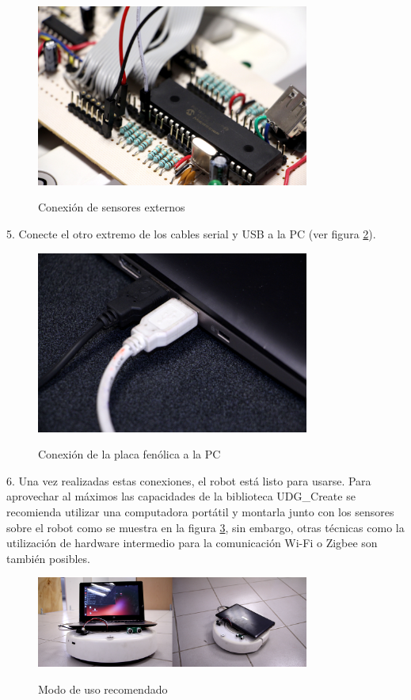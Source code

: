 \documentclass[letterpaper]{book}
\begin{document}
\begin{figure}
\begin{center}
\includegraphics[width=0.8\textwidth]{figures/sensors.jpg}
\caption{Conexión de sensores externos}
\centering
\label{fig:sensors}
\end{center}
\end{figure} 
5. Conecte el otro extremo de los cables serial y USB a la PC (ver figura \ref{fig:computerCables}).\\
\begin{figure}
\begin{center}
\includegraphics[width=0.8\textwidth]{figures/computerCables.jpg}
\caption{Conexión de la placa fenólica a la PC}
\centering
\label{fig:computerCables}
\end{center}
\end{figure} 
6. Una vez realizadas estas conexiones, el robot está listo para usarse. Para aprovechar al máximos las capacidades de la biblioteca UDG\_Create se recomienda utilizar una computadora portátil y montarla junto con los sensores sobre el robot como se muestra en la figura \ref{fig:usage}, sin embargo, otras técnicas como la utilización de hardware intermedio para la comunicación Wi-Fi o Zigbee son también posibles.
\begin{figure}
\begin{center}
\includegraphics[width=0.8\textwidth]{figures/usage.jpg}
\caption{Modo de uso recomendado}
\centering
\label{fig:usage}
\end{center}
\end{figure}
\end{document}
